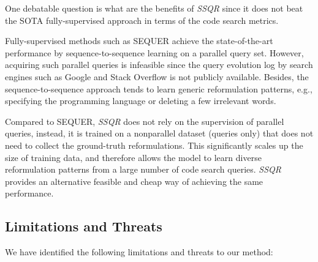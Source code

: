 \documentclass[sigconf,screen]{acmart}
\newcommand{\eg}{\hbox{e.g.}\xspace}
\newcommand{\ie}{\hbox{i.e.}\xspace}
\newcommand{\ourmethod}{\textit{SSQR}\xspace}
\begin{document}
One debatable question is what are the benefits of \ourmethod since it does not beat the SOTA fully-supervised approach in terms of the code search metrics. 


Fully-supervised methods such as SEQUER achieve the state-of-the-art performance by sequence-to-sequence learning on a parallel query set. However, acquiring such parallel queries is infeasible since the query evolution log by search engines such as Google and Stack Overflow is not publicly available. Besides, the sequence-to-sequence approach tends to learn generic reformulation patterns, \eg, specifying the programming language or deleting a few irrelevant words. 


Compared to SEQUER, \ourmethod does not rely on the supervision of parallel queries, instead, it is trained on a nonparallel dataset (queries only) that does not need to collect the ground-truth reformulations. This significantly scales up the size of training data, and therefore allows the model to learn diverse reformulation patterns from a large number of code search queries. 
\ourmethod provides an alternative feasible and cheap way of achieving the same performance. %

\subsection{Limitations and Threats}
We have identified the following limitations and threats to our method:
\end{document}
